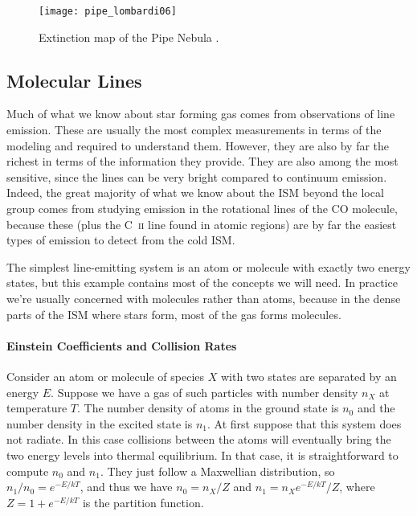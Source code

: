\begin{figure}
\texttt{[image: pipe\_lombardi06]}
\caption[Dust extinction map of the Pipe Nebula]{
\label{fig:pipe_lombardi06}
Extinction map of the Pipe Nebula \citep{lombardi06a}.
}
\end{figure}


\subsection{Molecular Lines}

Much of what we know about star forming gas comes from observations of line emission. These are usually the most complex measurements in terms of the modeling and required to understand them. However, they are also by far the richest in terms of the information they provide. They are also among the most sensitive, since the lines can be very bright compared to continuum emission. Indeed, the great majority of what we know about the ISM beyond the local group comes from studying emission in the rotational lines of the CO molecule, because these (plus the C~\textsc{ii} line found in atomic regions) are by far the easiest types of emission to detect from the cold ISM.

The simplest line-emitting system is an atom or molecule with exactly two energy states, but this example contains most of the concepts we will need. In practice we're usually concerned with molecules rather than atoms, because in the dense parts of the ISM where stars form, most of the gas forms molecules.

\paragraph{Einstein Coefficients and Collision Rates}

Consider an atom or molecule of species $X$ with two states are separated by an energy $E$. Suppose we have a gas of such particles with number density $n_X$ at temperature $T$. The number density of atoms in the ground state is $n_0$ and the number density in the excited state is $n_1$. At first suppose that this system does not radiate. In this case collisions between the atoms will eventually bring the two energy levels into thermal equilibrium. In that case, it is straightforward to compute $n_0$ and $n_1$. They just follow a Maxwellian distribution, so $n_1/n_0 = e^{-E/kT}$, and thus we have $n_0 = n_X /Z$ and $n_1 = n_X e^{-E/kT}/Z$, where $Z=1+e^{-E/kT}$ is the partition function.


